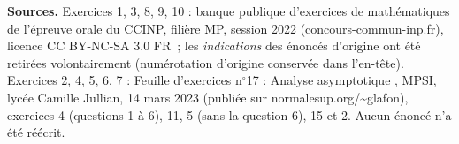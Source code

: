\documentclass[11pt,a4paper]{article}
\begin{document}
\vfill
\begin{small}
\noindent\textbf{Sources.} Exercices 1, 3, 8, 9, 10 : banque publique d'exercices de math\'ematiques de l'\'epreuve orale du CCINP, fili\`ere MP, session 2022
(concours-commun-inp.fr), licence CC BY-NC-SA 3.0 FR~; les \emph{indications} des \'enonc\'es d'origine ont \'et\'e retir\'ees volontairement (num\'erotation d'origine conserv\'ee dans l'en-t\^ete).
Exercices 2, 4, 5, 6, 7 : \og Feuille d'exercices n$^{\circ}$17 : Analyse asymptotique \fg, MPSI, lyc\'ee Camille Jullian, 14 mars 2023 (publi\'ee sur normalesup.org/\textasciitilde glafon), exercices 4 (questions 1 \`a 6), 11, 5 (sans la question 6), 15 et 2.
Aucun \'enonc\'e n'a \'et\'e r\'e\'ecrit.
\end{small}
\end{document}
